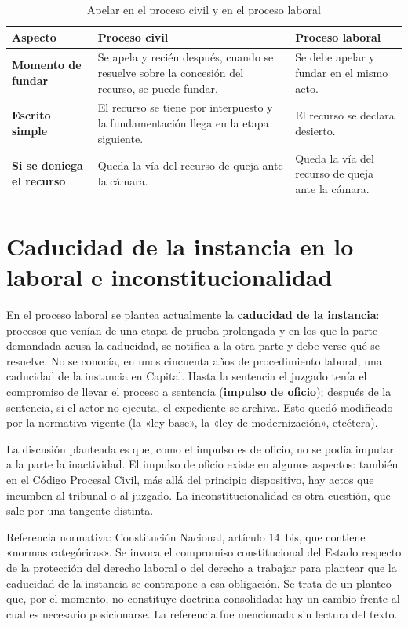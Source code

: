 \documentclass[12pt,oneside]{book}
\begin{document}
\begin{table}[H]
\centering
\caption{Apelar en el proceso civil y en el proceso laboral}
\small
\begin{tabularx}{\textwidth}{>{\raggedright\arraybackslash}p{3.2cm} Y Y}
\toprule
\textbf{Aspecto} & \textbf{Proceso civil} & \textbf{Proceso laboral} \\
\midrule
\textbf{Momento de fundar} & Se apela y recién después, cuando se resuelve sobre la concesión del recurso, se puede fundar. & Se debe apelar y fundar en el mismo acto. \\
\textbf{Escrito simple} & El recurso se tiene por interpuesto y la fundamentación llega en la etapa siguiente. & El recurso se declara desierto. \\
\textbf{Si se deniega el recurso} & Queda la vía del recurso de queja ante la cámara. & Queda la vía del recurso de queja ante la cámara. \\
\bottomrule
\end{tabularx}
\end{table}

\section{Caducidad de la instancia en lo laboral e inconstitucionalidad}

En el proceso laboral se plantea actualmente la \textbf{caducidad de la instancia}: procesos que venían de una etapa de prueba prolongada y en los que la parte demandada acusa la caducidad, se notifica a la otra parte y debe verse qué se resuelve. No se conocía, en unos cincuenta años de procedimiento laboral, una caducidad de la instancia en Capital. Hasta la sentencia el juzgado tenía el compromiso de llevar el proceso a sentencia (\textbf{impulso de oficio}); después de la sentencia, si el actor no ejecuta, el expediente se archiva. Esto quedó modificado por la normativa vigente (la «ley base», la «ley de modernización», etcétera).

La discusión planteada es que, como el impulso es de oficio, no se podía imputar a la parte la inactividad. El impulso de oficio existe en algunos aspectos: también en el Código Procesal Civil, más allá del principio dispositivo, hay actos que incumben al tribunal o al juzgado. La inconstitucionalidad es otra cuestión, que sale por una tangente distinta.

\begin{note}
Referencia normativa: Constitución Nacional, artículo 14~bis, que contiene «normas categóricas». Se invoca el compromiso constitucional del Estado respecto de la protección del derecho laboral o del derecho a trabajar para plantear que la caducidad de la instancia se contrapone a esa obligación. Se trata de un planteo que, por el momento, no constituye doctrina consolidada: hay un cambio frente al cual es necesario posicionarse. La referencia fue mencionada sin lectura del texto.
\end{note}
\end{document}
